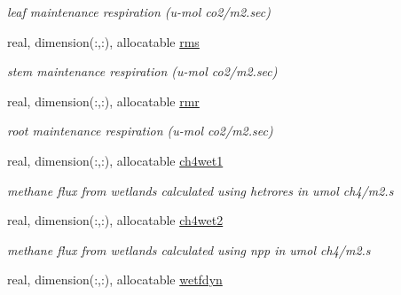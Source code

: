 \begin{DoxyCompactItemize}
\begin{DoxyCompactList}\small\item\em leaf maintenance respiration (u-\/mol co2/m2.\+sec) \end{DoxyCompactList}\item 
\hypertarget{structctem__statevars_1_1veg__rot_a49098f68d220bf5488df8341c7da2893}{}real, dimension(\+:,\+:), allocatable \hyperlink{structctem__statevars_1_1veg__rot_a49098f68d220bf5488df8341c7da2893}{rms}\label{structctem__statevars_1_1veg__rot_a49098f68d220bf5488df8341c7da2893}

\begin{DoxyCompactList}\small\item\em stem maintenance respiration (u-\/mol co2/m2.\+sec) \end{DoxyCompactList}\item 
\hypertarget{structctem__statevars_1_1veg__rot_a73fbc554ffed132443187dc5cd03c9f7}{}real, dimension(\+:,\+:), allocatable \hyperlink{structctem__statevars_1_1veg__rot_a73fbc554ffed132443187dc5cd03c9f7}{rmr}\label{structctem__statevars_1_1veg__rot_a73fbc554ffed132443187dc5cd03c9f7}

\begin{DoxyCompactList}\small\item\em root maintenance respiration (u-\/mol co2/m2.\+sec) \end{DoxyCompactList}\item 
\hypertarget{structctem__statevars_1_1veg__rot_ad5eded7b29c9ef90559fc027f9f02e4b}{}real, dimension(\+:,\+:), allocatable \hyperlink{structctem__statevars_1_1veg__rot_ad5eded7b29c9ef90559fc027f9f02e4b}{ch4wet1}\label{structctem__statevars_1_1veg__rot_ad5eded7b29c9ef90559fc027f9f02e4b}

\begin{DoxyCompactList}\small\item\em methane flux from wetlands calculated using hetrores in umol ch4/m2.\+s \end{DoxyCompactList}\item 
\hypertarget{structctem__statevars_1_1veg__rot_a0261920e3fafa54faf4fae34aafb395a}{}real, dimension(\+:,\+:), allocatable \hyperlink{structctem__statevars_1_1veg__rot_a0261920e3fafa54faf4fae34aafb395a}{ch4wet2}\label{structctem__statevars_1_1veg__rot_a0261920e3fafa54faf4fae34aafb395a}

\begin{DoxyCompactList}\small\item\em methane flux from wetlands calculated using npp in umol ch4/m2.\+s \end{DoxyCompactList}\item 
\hypertarget{structctem__statevars_1_1veg__rot_afa5ada8ecceab568acbfce2b743b421f}{}real, dimension(\+:,\+:), allocatable \hyperlink{structctem__statevars_1_1veg__rot_afa5ada8ecceab568acbfce2b743b421f}{wetfdyn}\label{structctem__statevars_1_1veg__rot_afa5ada8ecceab568acbfce2b743b421f}


\end{DoxyCompactItemize}
